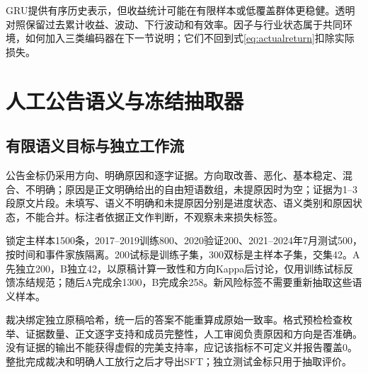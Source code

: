 GRU提供有序历史表示\cite{r13}，但收益统计可能在有限样本或低覆盖群体更稳健。透明对照保留过去累计收益、波动、下行波动和有效率。因子与行业状态属于共同环境，如何加入三类编码器在下一节说明；它们不回到式\eqref{eq:actualreturn}扣除实际损失。

\section{人工公告语义与冻结抽取器}
\subsection{有限语义目标与独立工作流}
公告金标仍采用方向、明确原因和逐字证据。方向取改善、恶化、基本稳定、混合、不明确；原因是正文明确给出的自由短语数组，未提原因时为空；证据为1--3段原文片段。未填写、语义不明确和未提原因分别是进度状态、语义类别和原因状态，不能合并。标注者依据正文作判断，不观察未来损失标签。


锁定主样本1500条，2017--2019训练800、2020验证200、2021--2024年7月测试500，按时间和事件家族隔离。200试标是训练子集，300双标是主样本子集，交集42。A先独立200，B独立42，以原稿计算一致性和方向Kappa后讨论，仅用训练试标反馈冻结规范；随后A完成余1300，B完成余258。新风险标签不需要重新抽取这些语义样本。


裁决绑定独立原稿哈希，统一后的答案不能重算成原始一致率。格式预检检查枚举、证据数量、正文逐字支持和成员完整性，人工审阅负责原因和方向是否准确。没有证据的输出不能获得虚假的完美支持率，应记该指标不可定义并报告覆盖0。整批完成裁决和明确人工放行之后才导出SFT；独立测试金标只用于抽取评价。

